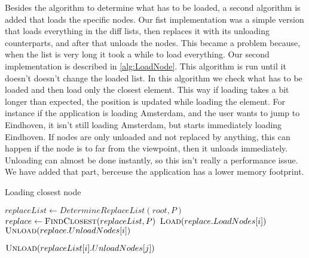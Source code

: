 Besides the algorithm to determine what has to be loaded, a second algorithm is added that loads the specific nodes. Our fist implementation was a simple version that loads everything in the diff lists, then replaces it with its unloading counterparts, and after that unloads the nodes. This became a problem because, when the list is very long it took a while to load everything. Our second implementation is described in \ref{alg:LoadNode}. This algorithm is run until it doesn't doesn't change the loaded list. In this algorithm we check what has to be loaded and then load only the closest element. This way if loading takes a bit longer than expected, the position is updated while loading the element. For instance if the application is loading Amsterdam, and the user wants to jump to Eindhoven, it isn't still loading Amsterdam, but starts immediately loading Eindhoven. If nodes are only unloaded and not replaced by anything, this can happen if the node is to far from the viewpoint, then it unloads immediately. Unloading can almost be done instantly, so this isn't really a performance issue. We have added that part, berceuse the application has a lower memory footprint.

\begin{algorithm}[h]
\caption{Loading closest node}\label{alg:LoadNode}
\begin{algorithmic}[1]
 
    \State $replaceList \gets DetermineReplaceList(root, P)$
        \State $replace \gets \Call{FindClosest}{replaceList, P}$
            \State $\Call{Load}{replace.LoadNodes[i]}$
        \EndFor
            \State $\Call{Unload}{replace.UnloadNodes[i]}$
        \EndFor

                    \State $\Call{Unload}{replaceList[i].UnloadNodes[j]}$
                \EndFor
            \EndIf
        \EndFor
    \EndIf
\EndProcedure
\end{algorithmic}
\end{algorithm} 